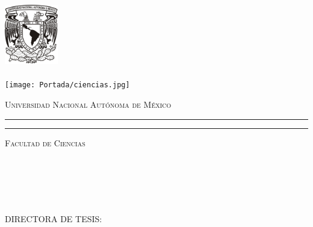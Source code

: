 \begin{center}
\hskip-1.5cm
\begin{minipage}[c][10cm][s]{3cm} 
  \begin{center}
    \includegraphics[height=2.6cm]{Portada/Unam.jpg}\\[10pt] %
    \hskip2pt\vrule width2pt height13cm\hskip1mm
    \vrule width1pt height13cm\\[10pt]
    \texttt{[image: Portada/ciencias.jpg]} %
  \end{center}
\end{minipage} \quad
\begin{minipage}[c][9.5cm][s]{10cm}
  \begin{center}
    {\Large \scshape Universidad Nacional Aut\'onoma de M\'exico}
    \vspace{.3cm}
    \hrule height2pt
    \vspace{.1cm}
    \hrule height1pt
    \vspace{.3cm}
    {\scshape \large Facultad de Ciencias}

    \vspace{3cm}

    {\huge \scshape \rmfamily \eltitulo} %

    \vspace{3cm}

    \\[8pt]
    \\[3pt]
    \makebox[8cm][s]{\lacarrera}\\[13pt]
    \\[3pt]
    \makebox[8cm][s]{\elnombre}

    \vspace{2cm}

    {\small DIRECTORA DE TESIS:\\ \eldirector}

    \vspace{2cm}

    \lafecha
    
  \end{center}
\end{minipage}
\end{center}